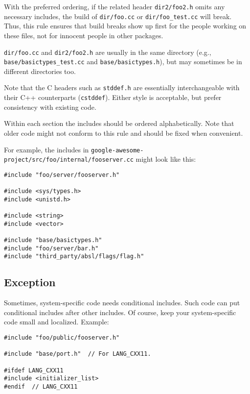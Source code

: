 With the preferred ordering, if the related header \texttt{dir2/foo2.h} omits any necessary includes, the build of \texttt{dir/foo.cc} or \texttt{dir/foo_test.cc} will break. Thus, this rule ensures that build breaks show up first for the people working on these files, not for innocent people in other packages.

\texttt{dir/foo.cc} and \texttt{dir2/foo2.h} are usually in the same directory (e.g., \texttt{base/basictypes_test.cc} and \texttt{base/basictypes.h}), but may sometimes be in different directories too.

Note that the C headers such as \texttt{stddef.h} are essentially interchangeable with their C++ counterparts (\texttt{cstddef}). Either style is acceptable, but prefer consistency with existing code.

Within each section the includes should be ordered alphabetically. Note that older code might not conform to this rule and should be fixed when convenient.

For example, the includes in \texttt{google-awesome-project/src/foo/internal/fooserver.cc} might look like this:
\begin{verbatim}
#include "foo/server/fooserver.h"

#include <sys/types.h>
#include <unistd.h>

#include <string>
#include <vector>

#include "base/basictypes.h"
#include "foo/server/bar.h"
#include "third_party/absl/flags/flag.h"
\end{verbatim}

\subsection{Exception}
Sometimes, system-specific code needs conditional includes. Such code can put conditional includes after other includes. Of course, keep your system-specific code small and localized. Example:
\begin{verbatim}
#include "foo/public/fooserver.h"

#include "base/port.h"  // For LANG_CXX11.

#ifdef LANG_CXX11
#include <initializer_list>
#endif  // LANG_CXX11
\end{verbatim}
